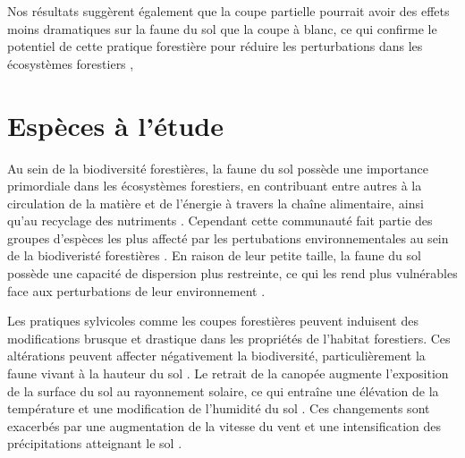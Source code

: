 Nos résultats suggèrent également que la coupe partielle pourrait avoir des effets moins dramatiques sur la faune du sol que la coupe à blanc, 
ce qui confirme le potentiel de cette pratique forestière pour réduire les perturbations dans les écosystèmes forestiers \citep{Kudrin2023metaanalysiseffects},




\section*{Espèces à l'étude}
\label{sec:species}

Au sein de la biodiversité forestières, la faune du sol possède une importance primordiale dans les écosystèmes forestiers, en contribuant entre autres à la circulation de la matière et de l'énergie à travers la chaîne alimentaire, ainsi qu'au recyclage des nutriments \citep{Seibold2021contributioninsects,Kudrin2023metaanalysiseffects}.
Cependant cette communauté fait partie des groupes d'espèces les plus affecté par les pertubations environnementales au sein de la biodiveristé forestières \citep{Marshall2000Impactsforest,Coyle2017Soilfauna}. 
En raison de leur petite taille, la faune du sol possède une capacité de dispersion plus restreinte, ce qui les rend plus vulnérables face aux perturbations de leur environnement \citep{Kudrin2023metaanalysiseffects}.


Les pratiques sylvicoles comme les coupes forestières peuvent induisent des modifications brusque et drastique dans les propriétés de l'habitat forestiers. 
Ces altérations peuvent affecter négativement la biodiversité, particulièrement la faune vivant à la hauteur du sol \citep{Lindo2003Microbialbiomass,Paillet2010Biodiversitydifferences,Fedrowitz2014Canretention,Chaudhary2016Impactforest}. 
Le retrait de la canopée augmente l'exposition de la surface du sol au rayonnement solaire, ce qui entraîne une élévation de la température et une modification de l'humidité du sol \citep{Lindo2003Microbialbiomass,Brook2008Synergiesextinction,Zhang2022Intensiveforest}. 
Ces changements sont exacerbés par une augmentation de la vitesse du vent et une intensification des précipitations atteignant le sol \citep{Keenan1993ecologicaleffects,Heithecker2007Edgerelatedgradients}. 

